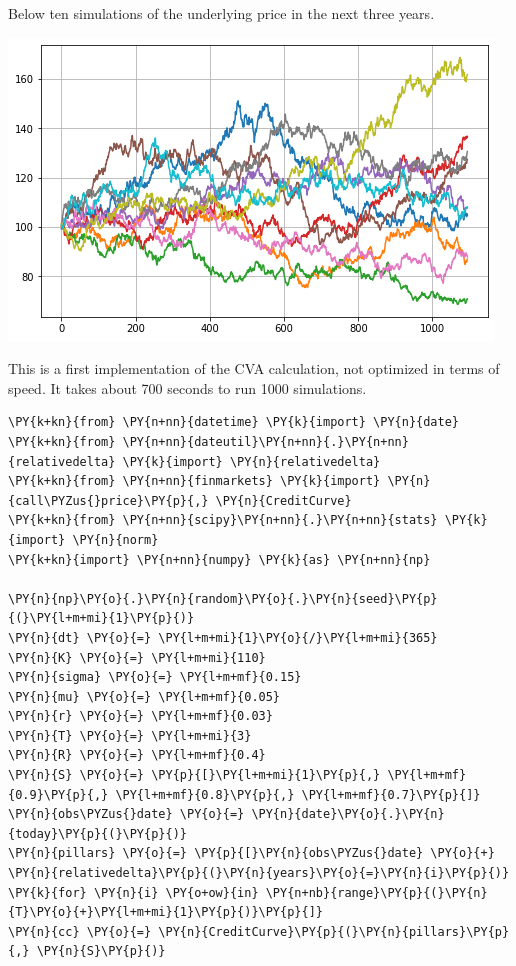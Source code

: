 \begin{Answer}
Below ten simulations of the underlying price in the next three years.

\includegraphics{figures/underlying_simulation}

This is a first implementation of the CVA calculation, not optimized in terms of speed. It takes about 700 seconds to run 1000 simulations.

\begin{codebox}[size=fbox, boxrule=1pt, colback=cellbackground, colframe=cellborder]
\begin{Verbatim}[commandchars=\\\{\}]
\PY{k+kn}{from} \PY{n+nn}{datetime} \PY{k}{import} \PY{n}{date}
\PY{k+kn}{from} \PY{n+nn}{dateutil}\PY{n+nn}{.}\PY{n+nn}{relativedelta} \PY{k}{import} \PY{n}{relativedelta}
\PY{k+kn}{from} \PY{n+nn}{finmarkets} \PY{k}{import} \PY{n}{call\PYZus{}price}\PY{p}{,} \PY{n}{CreditCurve}
\PY{k+kn}{from} \PY{n+nn}{scipy}\PY{n+nn}{.}\PY{n+nn}{stats} \PY{k}{import} \PY{n}{norm}
\PY{k+kn}{import} \PY{n+nn}{numpy} \PY{k}{as} \PY{n+nn}{np}
		
\PY{n}{np}\PY{o}{.}\PY{n}{random}\PY{o}{.}\PY{n}{seed}\PY{p}{(}\PY{l+m+mi}{1}\PY{p}{)}
\PY{n}{dt} \PY{o}{=} \PY{l+m+mi}{1}\PY{o}{/}\PY{l+m+mi}{365}
\PY{n}{K} \PY{o}{=} \PY{l+m+mi}{110}
\PY{n}{sigma} \PY{o}{=} \PY{l+m+mf}{0.15}
\PY{n}{mu} \PY{o}{=} \PY{l+m+mf}{0.05}
\PY{n}{r} \PY{o}{=} \PY{l+m+mf}{0.03}
\PY{n}{T} \PY{o}{=} \PY{l+m+mi}{3}
\PY{n}{R} \PY{o}{=} \PY{l+m+mf}{0.4}
\PY{n}{S} \PY{o}{=} \PY{p}{[}\PY{l+m+mi}{1}\PY{p}{,} \PY{l+m+mf}{0.9}\PY{p}{,} \PY{l+m+mf}{0.8}\PY{p}{,} \PY{l+m+mf}{0.7}\PY{p}{]}
\PY{n}{obs\PYZus{}date} \PY{o}{=} \PY{n}{date}\PY{o}{.}\PY{n}{today}\PY{p}{(}\PY{p}{)}
\PY{n}{pillars} \PY{o}{=} \PY{p}{[}\PY{n}{obs\PYZus{}date} \PY{o}{+} \PY{n}{relativedelta}\PY{p}{(}\PY{n}{years}\PY{o}{=}\PY{n}{i}\PY{p}{)} \PY{k}{for} \PY{n}{i} \PY{o+ow}{in} \PY{n+nb}{range}\PY{p}{(}\PY{n}{T}\PY{o}{+}\PY{l+m+mi}{1}\PY{p}{)}\PY{p}{]}
\PY{n}{cc} \PY{o}{=} \PY{n}{CreditCurve}\PY{p}{(}\PY{n}{pillars}\PY{p}{,} \PY{n}{S}\PY{p}{)}
		

\end{Verbatim}
\end{codebox}
\end{Answer}
